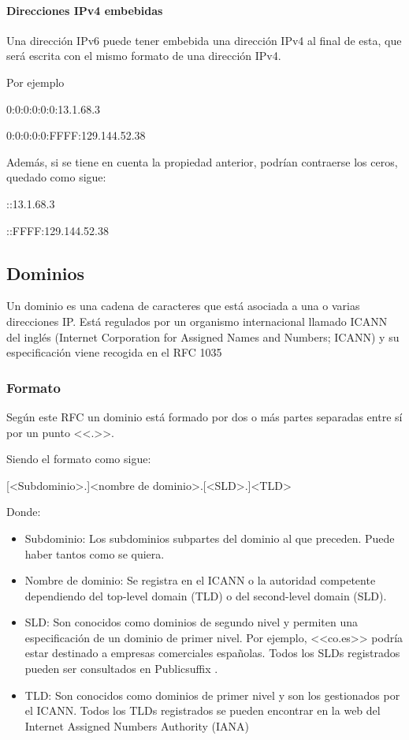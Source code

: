 \paragraph{Direcciones IPv4 embebidas}\label{subsec:ipv4}
Una dirección IPv6 puede tener embebida una dirección IPv4 al final de esta, que será escrita con el mismo formato de una dirección IPv4. 

Por ejemplo 

    0:0:0:0:0:0:13.1.68.3

    0:0:0:0:0:FFFF:129.144.52.38
    
Además, si se tiene en cuenta la propiedad anterior, podrían contraerse los ceros, quedado como sigue: 

    ::13.1.68.3

    ::FFFF:129.144.52.38

\subsection{Dominios}\label{subsec:Dominios}
Un dominio es una cadena de caracteres que está asociada a una o varias direcciones IP. Está regulados por un organismo internacional llamado ICANN del inglés (Internet Corporation for Assigned Names and Numbers; ICANN) \cite{icann} y su especificación viene recogida en el RFC 1035 \cite{rfc1035}

\subsubsection{Formato}
Según este RFC un dominio está formado por dos o más partes separadas entre sí por un punto <<.>>. 

Siendo el formato como sigue: 

[<Subdominio>.]<nombre de dominio>.[<SLD>.]<TLD>

Donde: 
\begin{itemize}
    \item Subdominio: Los subdominios subpartes del dominio al que preceden. Puede haber tantos como se quiera.
    \item Nombre de dominio: Se registra en el ICANN o la autoridad competente dependiendo del top-level domain (TLD) o del second-level domain (SLD).
    \item SLD: Son conocidos como dominios de segundo nivel y permiten una especificación de un dominio de primer nivel. Por ejemplo, <<co.es>> podría estar destinado a empresas comerciales españolas. Todos los SLDs registrados pueden ser consultados en Publicsuffix \cite{SLD_list}.
    \item TLD: Son conocidos como dominios de primer nivel y son los gestionados por el ICANN. Todos los TLDs registrados se pueden encontrar en la web del Internet Assigned Numbers Authority (IANA) \cite{TLD_list}
\end{itemize}

